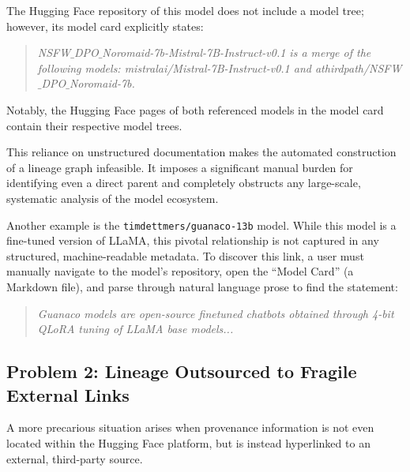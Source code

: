 \begin{tcolorbox}[
    title={\textbf{Case Study1: \texttt{DavidAU/NSFW\_DPO\_Noromaid-7b-Mistral-7B-Instruct-v0.1-GGUF}}},
    colback=gray!5!white, %
    colframe=gray!75!black, %
    fonttitle=\bfseries, %
    sharp corners %
]
The Hugging Face repository of this model does not include a model tree; however, its model card explicitly states:
\begin{quote}
    \textit{NSFW$\_$DPO$\_$Noromaid-7b-Mistral-7B-Instruct-v0.1 is a merge of the following models: mistralai/Mistral-7B-Instruct-v0.1 and athirdpath/NSFW$\_$DPO$\_$Noromaid-7b.}
\end{quote}

Notably, the Hugging Face pages of both referenced models in the model card contain their respective model trees.

This reliance on unstructured documentation makes the automated construction of a lineage graph infeasible. It imposes a significant manual burden for identifying even a direct parent and completely obstructs any large-scale, systematic analysis of the model ecosystem.
\end{tcolorbox}

\begin{tcolorbox}[
    title={\textbf{Case Study2: \texttt{timdettmers/guanaco-13b}}},
    colback=gray!5!white, %
    colframe=gray!75!black, %
    fonttitle=\bfseries, %
    sharp corners %
]
Another example is the \texttt{timdettmers/guanaco-13b} model. While this model is a fine-tuned version of LLaMA, this pivotal relationship is not captured in any structured, machine-readable metadata. To discover this link, a user must manually navigate to the model's repository, open the ``Model Card'' (a Markdown file), and parse through natural language prose to find the statement:
\begin{quote}
    \textit{Guanaco models are open-source finetuned chatbots obtained through 4-bit QLoRA tuning of LLaMA base models...}
\end{quote}

\end{tcolorbox}

\subsection{Problem 2: Lineage Outsourced to Fragile External Links}
A more precarious situation arises when provenance information is not even located within the Hugging Face platform, but is instead hyperlinked to an external, third-party source.

